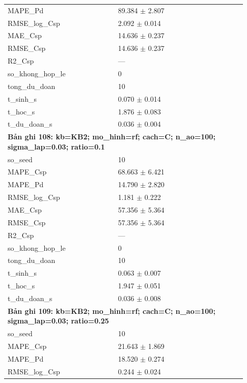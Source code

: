 \begin{longtable}{p{0.43\linewidth}p{0.50\linewidth}}
MAPE\_\allowbreak Pd & 89.384 $\pm$ 2.807 \\
RMSE\_\allowbreak log\_\allowbreak Csp & 2.092 $\pm$ 0.014 \\
MAE\_\allowbreak Csp & 14.636 $\pm$ 0.237 \\
RMSE\_\allowbreak Csp & 14.636 $\pm$ 0.237 \\
R2\_\allowbreak Csp & — \\
so\_\allowbreak khong\_\allowbreak hop\_\allowbreak le & 0 \\
tong\_\allowbreak du\_\allowbreak doan & 10 \\
t\_\allowbreak sinh\_\allowbreak s & 0.070 $\pm$ 0.014 \\
t\_\allowbreak hoc\_\allowbreak s & 1.876 $\pm$ 0.083 \\
t\_\allowbreak du\_\allowbreak doan\_\allowbreak s & 0.036 $\pm$ 0.004 \\
\midrule
\multicolumn{2}{p{0.95\linewidth}}{\textbf{Bản ghi 108: kb=KB2; mo\_hinh=rf; cach=C; n\_ao=100; sigma\_lap=0.03; ratio=0.1}} \\
so\_\allowbreak seed & 10 \\
MAPE\_\allowbreak Csp & 68.663 $\pm$ 6.421 \\
MAPE\_\allowbreak Pd & 14.790 $\pm$ 2.820 \\
RMSE\_\allowbreak log\_\allowbreak Csp & 1.181 $\pm$ 0.222 \\
MAE\_\allowbreak Csp & 57.356 $\pm$ 5.364 \\
RMSE\_\allowbreak Csp & 57.356 $\pm$ 5.364 \\
R2\_\allowbreak Csp & — \\
so\_\allowbreak khong\_\allowbreak hop\_\allowbreak le & 0 \\
tong\_\allowbreak du\_\allowbreak doan & 10 \\
t\_\allowbreak sinh\_\allowbreak s & 0.063 $\pm$ 0.007 \\
t\_\allowbreak hoc\_\allowbreak s & 1.947 $\pm$ 0.051 \\
t\_\allowbreak du\_\allowbreak doan\_\allowbreak s & 0.036 $\pm$ 0.008 \\
\midrule
\multicolumn{2}{p{0.95\linewidth}}{\textbf{Bản ghi 109: kb=KB2; mo\_hinh=rf; cach=C; n\_ao=100; sigma\_lap=0.03; ratio=0.25}} \\
so\_\allowbreak seed & 10 \\
MAPE\_\allowbreak Csp & 21.643 $\pm$ 1.869 \\
MAPE\_\allowbreak Pd & 18.520 $\pm$ 0.274 \\
RMSE\_\allowbreak log\_\allowbreak Csp & 0.244 $\pm$ 0.024 \\

\end{longtable}
